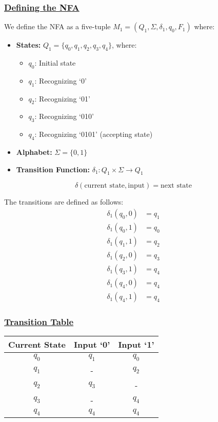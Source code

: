 \documentclass[12pt]{article}
\begin{document}
	\subsubsection*{\underline{Defining the NFA}}
	We define the NFA as a five-tuple $M_1 = (Q_1, \Sigma, \delta_1, q_0, F_1)$ where:
	
	\begin{itemize}
		\item \textbf{States:} $Q_1 = \{q_0, q_1, q_2, q_3, q_4\}$, where:
		\begin{itemize}
			\item $q_0$: Initial state
			\item $q_1$: Recognizing `0'
			\item $q_2$: Recognizing `01'
			\item $q_3$: Recognizing `010'
			\item $q_4$: Recognizing `0101' (accepting state)
		\end{itemize}
		\item \textbf{Alphabet:} $\Sigma = \{0, 1\}$
		\item \textbf{Transition Function:} $\delta_1: Q_1 \times \Sigma \to Q_1$
	\end{itemize}
	
	\begin{mdframed}[linewidth=1pt, leftmargin=3cm, rightmargin=3.2cm]
		\[\delta(\text{current state}, \text{input}) = \text{next state}\]
	\end{mdframed}
	
	The transitions are defined as follows:
	\begin{align*}
		\delta_1(q_0, 0) &= q_1 \\
		\delta_1(q_0, 1) &= q_0 \\
		\delta_1(q_1, 1) &= q_2 \\
		\delta_1(q_2, 0) &= q_3 \\
		\delta_1(q_3, 1) &= q_4 \\
		\delta_1(q_4, 0) &= q_4 \\
		\delta_1(q_4, 1) &= q_4
	\end{align*}
	
	\subsubsection*{\underline{Transition Table}}
	\begin{center}
		\begin{tabular}{ccc}
			\toprule
			\textbf{Current State} & \textbf{Input `0'} & \textbf{Input `1'} \\
			\midrule
			$q_0$ & $q_1$ & $q_0$ \\
			$q_1$ & - & $q_2$ \\
			$q_2$ & $q_3$ & - \\
			$q_3$ & - & $q_4$ \\
			$q_4$ & $q_4$ & $q_4$ \\
			\bottomrule
		\end{tabular}
	\end{center}
	
\end{document}
